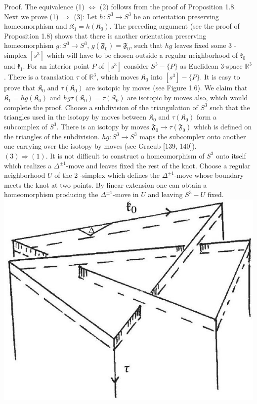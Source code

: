 \documentclass[10pt, letterpaper]{article}
\begin{document}
Proof. The equivalence (1) $\Longleftrightarrow$ (2) follows from the proof of Proposition 1.8.\\
Next we prove (1) $\Longrightarrow$ (3): Let $h: S^{3} \rightarrow S^{3}$ be an orientation preserving homeomorphism and $\mathfrak{K}_{1}=h\left(\mathfrak{K}_{0}\right)$. The preceding argument (see the proof of Proposition 1.8) shows that there is another orientation preserving homeomorphism $g: S^{3} \rightarrow S^{3}$, $g\left(\mathfrak{F}_{0}\right)=\mathfrak{F}_{0}$, such that $h g$ leaves fixed some 3 -simplex $\left[s^{3}\right]$ which will have to be chosen outside a regular neighborhood of $\mathfrak{k}_{0}$ and $\mathfrak{k}_{1}$. For an interior point $P$ of $\left[s^{3}\right]$ consider $S^{3}-\{P\}$ as Euclidean 3-space $\mathbb{R}^{3}$. There is a translation $\tau$ of $\mathbb{R}^{3}$, which moves $\mathfrak{K}_{0}$ into $\left[s^{3}\right]-\{P\}$. It is easy to prove that $\mathfrak{K}_{0}$ and $\tau\left(\mathfrak{K}_{0}\right)$ are isotopic by moves (see Figure 1.6). We claim that $\mathfrak{K}_{1}=h g\left(\mathfrak{K}_{0}\right)$ and $h g \tau\left(\mathfrak{K}_{0}\right)=\tau\left(\mathfrak{K}_{0}\right)$ are isotopic by moves also, which would complete the proof. Choose a subdivision of the triangulation of $S^{3}$ such that the triangles used in the isotopy by moves between $\mathfrak{K}_{0}$ and $\tau\left(\mathfrak{K}_{0}\right)$ form a subcomplex of $S^{3}$. There is an isotopy by moves $\mathfrak{F}_{0} \rightarrow \tau\left(\mathfrak{F}_{0}\right)$ which is defined on the triangles of the subdivision. $h g: S^{3} \rightarrow S^{3}$ maps the subcomplex onto another one carrying over the isotopy by moves (see Graeub [139, 140]).\\
$(3) \Longrightarrow(1)$. It is not difficult to construct a homeomorphism of $S^{3}$ onto itself which realizes a $\Delta^{ \pm 1}$-move and leaves fixed the rest of the knot. Choose a regular neighborhood $U$ of the 2 -simplex which defines the $\Delta^{ \pm 1}$-move whose boundary meets the knot at two points. By linear extension one can obtain a homeomorphism producing the $\Delta^{ \pm 1}$-move in $U$ and leaving $S^{3}-U$ fixed.\\
\includegraphics[scale=0.2,center]{2025_05_21_9c06be8de7a55410f8c1g-022}
\end{document}
